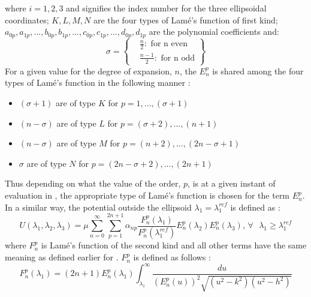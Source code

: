 %
where $i = 1, 2, 3$ and signifies the index number for the three ellipsoidal coordinates; $K,L,M,N$ are the four types of Lam\' e's function of first kind; $a_{0p}, a_{1p},..., b_{0p}, b_{1p},..., c_{0p}, c_{1p},..., d_{0p}, d_{1p}$ are the polynomial coefficients and:
\begin{equation}
\label{lame_sigma}
\sigma = \left\{
				\begin{aligned}
				& \frac{n}{2} \colon \text{ for n even}\\
				& \frac{n-1}{2} \colon \text{ for n odd}
				\end{aligned}
		\right\}
\end{equation}
%
For a given value for the degree of expansion, $n$, the $E_n^p$ is shared among the four types of Lam\' e's function in the following manner \cite{ellipse_colorado}:
\begin{itemize}
\item $(\sigma + 1)$ are of type $K$ for $p = 1,...,(\sigma + 1)$\\
\item $(n-\sigma)$ are of type $L$ for $p = (\sigma+2),...,(n+1)$\\
\item $(n-\sigma)$ are of type $M$ for $p = (n+2),...,(2n-\sigma+1)$\\
\item $\sigma$ are of type $N$ for $p = (2n-\sigma+2),...,(2n+1)$
\end{itemize}
Thus depending on what the value of the order, $p$, is at a given instant of evaluation in , the appropriate type of Lam\' e's function is chosen for the term $E_n^p$.
\\
In a similar way, the potential outside the ellipsoid $\lambda_1 = \lambda_1^{ref}$ is defined as \cite{ellipse_colorado}:
\begin{equation}
\label{ellipse_out}
U(\lambda_1, \lambda_2, \lambda_3) = \mu \sum_{n=0}^{\infty} \sum_{p=1}^{2n+1} \alpha_{np} \frac{F_n^p(\lambda_1)}{F_n^p(\lambda_1^{ref})} E_n^p(\lambda_2) E_n^p(\lambda_3) \text{,    } \forall \text{ }\lambda_1 \geq \lambda_1^{ref}
\end{equation}
%
where $F_n^p$ is Lam\' e's function of the second kind and all other terms have the same meaning as defined earlier for . $F_n^p$ is defined as follows \cite{ellipse_colorado}:
\begin{equation}
\label{Lame's_F}
F_n^p(\lambda_1) = (2n+1) E_n^p(\lambda_1) \int_{\lambda_1}^{\infty} \frac{du}{(E_n^p(u))^2 \sqrt{(u^2-k^2)(u^2-h^2)}}
\end{equation}
